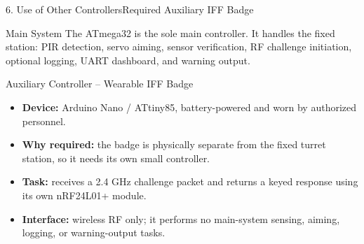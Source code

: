 \documentclass[aspectratio=169, 10pt]{beamer}
\begin{document}
\begin{frame}{6. Use of Other Controllers}{Required Auxiliary IFF Badge}
    \begin{block}{Main System}
        \small The ATmega32 is the sole main controller. It handles the fixed station: PIR detection, servo aiming, sensor verification, RF challenge initiation, optional logging, UART dashboard, and warning output.
    \end{block}
    \begin{block}{Auxiliary Controller -- Wearable IFF Badge}
        \small
        \begin{itemize}
            \item \textbf{Device:} Arduino Nano / ATtiny85, battery-powered and worn by authorized personnel.
            \item \textbf{Why required:} the badge is physically separate from the fixed turret station, so it needs its own small controller.
            \item \textbf{Task:} receives a 2.4 GHz challenge packet and returns a keyed response using its own nRF24L01+ module.
            \item \textbf{Interface:} wireless RF only; it performs no main-system sensing, aiming, logging, or warning-output tasks.
        \end{itemize}
    \end{block}
\end{frame}
\end{document}

